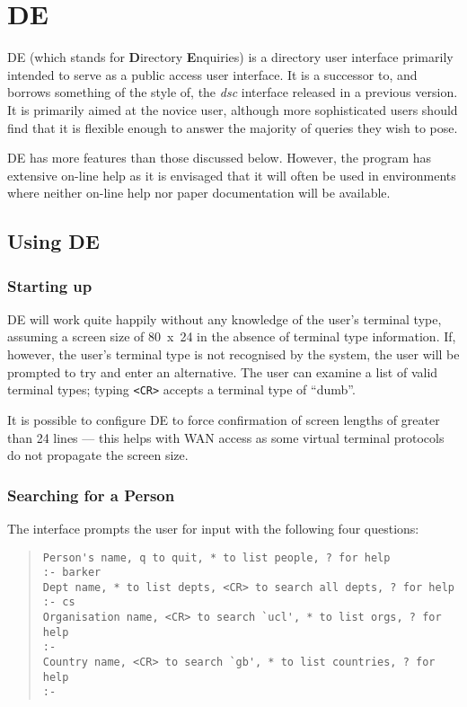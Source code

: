\chapter{DE}
\label{DUA:de}

DE (which stands for {\bf D}irectory {\bf E}nquiries) is a directory user
interface primarily intended to serve as a public access user interface.  It
is a successor to, and borrows something of the style of, the {\em dsc} 
interface released in a previous version.
It is primarily aimed at the novice user, although more sophisticated users
should find that it is flexible enough to answer the majority of queries
they wish to pose.  

DE has more features than those discussed below.  However, the program 
has extensive on-line help as it is envisaged that it will often be used in
environments where neither on-line help nor paper documentation will be
available.

\section {Using DE}

\subsection {Starting up}

DE will work quite happily without any knowledge of the user's
terminal type, assuming a screen size of 80~x~24 in the absence of terminal
type information.  If, however, the user's terminal type is not recognised
by the system, the user will be prompted to try and enter an alternative.
The user can examine a list of valid terminal types; typing \verb+<CR>+ accepts
a terminal type of ``dumb''.

It is possible to configure DE to force confirmation of screen lengths of
greater than 24 lines --- this helps with WAN access as some virtual terminal 
protocols do not propagate the screen size.

\subsection {Searching for a Person}

The interface prompts the user for input with the following four questions:

\begin{quote}\footnotesize\begin{verbatim}
Person's name, q to quit, * to list people, ? for help
:- barker
Dept name, * to list depts, <CR> to search all depts, ? for help
:- cs
Organisation name, <CR> to search `ucl', * to list orgs, ? for help
:- 
Country name, <CR> to search `gb', * to list countries, ? for help
:- 
\end{verbatim}\end{quote}


